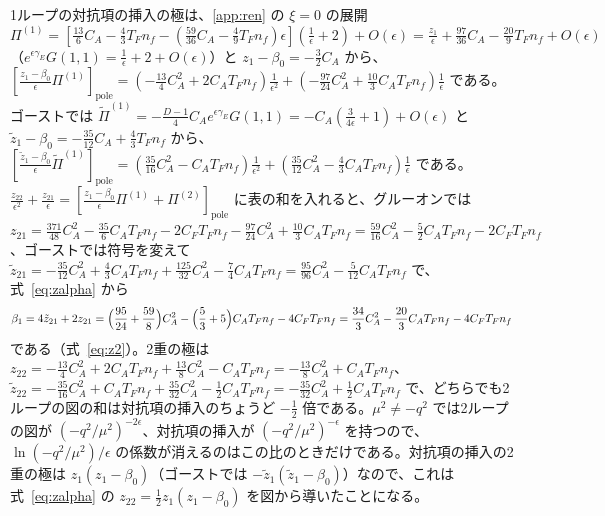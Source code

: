 \documentclass[a4paper,10pt]{ltjsarticle}
\begin{document}
1ループの対抗項の挿入の極は、\ref{app:ren} の $\xi=0$ の展開 $\Pi^{(1)}=[\frac{13}6C_A-\frac43T_Fn_f-(\frac{59}{36}C_A-\frac49T_Fn_f)\epsilon](\frac1\epsilon+2)+O(\epsilon)=\frac{z_1}\epsilon+\frac{97}{36}C_A-\frac{20}9T_Fn_f+O(\epsilon)$（$e^{\epsilon\gamma_E}G(1,1)=\frac1\epsilon+2+O(\epsilon)$）と $z_1-\beta_0=-\frac32C_A$ から、$[\frac{z_1-\beta_0}\epsilon\Pi^{(1)}]_{\mathrm{pole}}=(-\frac{13}4C_A^2+2C_AT_Fn_f)\frac1{\epsilon^2}+(-\frac{97}{24}C_A^2+\frac{10}3C_AT_Fn_f)\frac1\epsilon$ である。ゴーストでは $\tilde\Pi^{(1)}=-\frac{D-1}4C_Ae^{\epsilon\gamma_E}G(1,1)=-C_A(\frac3{4\epsilon}+1)+O(\epsilon)$ と $\tilde z_1-\beta_0=-\frac{35}{12}C_A+\frac43T_Fn_f$ から、$[\frac{\tilde z_1-\beta_0}\epsilon\tilde\Pi^{(1)}]_{\mathrm{pole}}=(\frac{35}{16}C_A^2-C_AT_Fn_f)\frac1{\epsilon^2}+(\frac{35}{12}C_A^2-\frac43C_AT_Fn_f)\frac1\epsilon$ である。$\frac{z_{22}}{\epsilon^2}+\frac{z_{21}}\epsilon=[\frac{z_1-\beta_0}\epsilon\Pi^{(1)}+\Pi^{(2)}]_{\mathrm{pole}}$ に表の和を入れると、グルーオンでは $z_{21}=\frac{371}{48}C_A^2-\frac{35}6C_AT_Fn_f-2C_FT_Fn_f-\frac{97}{24}C_A^2+\frac{10}3C_AT_Fn_f=\frac{59}{16}C_A^2-\frac52C_AT_Fn_f-2C_FT_Fn_f$、ゴーストでは符号を変えて $\tilde z_{21}=-\frac{35}{12}C_A^2+\frac43C_AT_Fn_f+\frac{125}{32}C_A^2-\frac74C_AT_Fn_f=\frac{95}{96}C_A^2-\frac5{12}C_AT_Fn_f$ で、式~\eqref{eq:zalpha} から
\begin{equation*}
\beta_1=4\tilde z_{21}+2z_{21}=\Bigl(\frac{95}{24}+\frac{59}8\Bigr)C_A^2-\Bigl(\frac53+5\Bigr)C_AT_Fn_f-4C_FT_Fn_f=\frac{34}3C_A^2-\frac{20}3C_AT_Fn_f-4C_FT_Fn_f
\end{equation*}
である（式~\eqref{eq:z2}）。2重の極は $z_{22}=-\frac{13}4C_A^2+2C_AT_Fn_f+\frac{13}8C_A^2-C_AT_Fn_f=-\frac{13}8C_A^2+C_AT_Fn_f$、$\tilde z_{22}=-\frac{35}{16}C_A^2+C_AT_Fn_f+\frac{35}{32}C_A^2-\frac12C_AT_Fn_f=-\frac{35}{32}C_A^2+\frac12C_AT_Fn_f$ で、どちらでも2ループの図の和は対抗項の挿入のちょうど $-\frac12$ 倍である。$\mu^2\ne-q^2$ では2ループの図が $(-q^2/\mu^2)^{-2\epsilon}$、対抗項の挿入が $(-q^2/\mu^2)^{-\epsilon}$ を持つので、$\ln(-q^2/\mu^2)/\epsilon$ の係数が消えるのはこの比のときだけである。対抗項の挿入の2重の極は $z_1(z_1-\beta_0)$（ゴーストでは $-\tilde z_1(\tilde z_1-\beta_0)$）なので、これは式~\eqref{eq:zalpha} の $z_{22}=\frac12z_1(z_1-\beta_0)$ を図から導いたことになる。
\end{document}
